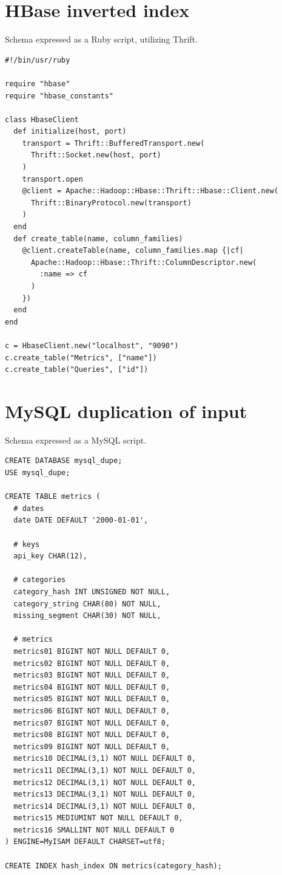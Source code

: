 \section{HBase inverted index}

Schema expressed as a Ruby script, utilizing Thrift.

\begin{verbatim}
#!/bin/usr/ruby

require "hbase"
require "hbase_constants"

class HbaseClient
  def initialize(host, port)
    transport = Thrift::BufferedTransport.new(
      Thrift::Socket.new(host, port)
    )
    transport.open
    @client = Apache::Hadoop::Hbase::Thrift::Hbase::Client.new(
      Thrift::BinaryProtocol.new(transport)
    )
  end
  def create_table(name, column_families)
    @client.createTable(name, column_families.map {|cf|
      Apache::Hadoop::Hbase::Thrift::ColumnDescriptor.new(
        :name => cf
      )
    })
  end
end

c = HbaseClient.new("localhost", "9090")
c.create_table("Metrics", ["name"])
c.create_table("Queries", ["id"])
\end{verbatim}

\section{MySQL duplication of input}

Schema expressed as a MySQL script.

\begin{verbatim}
CREATE DATABASE mysql_dupe;
USE mysql_dupe;

CREATE TABLE metrics ( 
  # dates
  date DATE DEFAULT '2000-01-01',

  # keys
  api_key CHAR(12),

  # categories  
  category_hash INT UNSIGNED NOT NULL,
  category_string CHAR(80) NOT NULL,
  missing_segment CHAR(30) NOT NULL,

  # metrics
  metrics01 BIGINT NOT NULL DEFAULT 0,
  metrics02 BIGINT NOT NULL DEFAULT 0,
  metrics03 BIGINT NOT NULL DEFAULT 0,
  metrics04 BIGINT NOT NULL DEFAULT 0,
  metrics05 BIGINT NOT NULL DEFAULT 0,
  metrics06 BIGINT NOT NULL DEFAULT 0,
  metrics07 BIGINT NOT NULL DEFAULT 0,
  metrics08 BIGINT NOT NULL DEFAULT 0,
  metrics09 BIGINT NOT NULL DEFAULT 0,
  metrics10 DECIMAL(3,1) NOT NULL DEFAULT 0,
  metrics11 DECIMAL(3,1) NOT NULL DEFAULT 0,
  metrics12 DECIMAL(3,1) NOT NULL DEFAULT 0,
  metrics13 DECIMAL(3,1) NOT NULL DEFAULT 0,
  metrics14 DECIMAL(3,1) NOT NULL DEFAULT 0,
  metrics15 MEDIUMINT NOT NULL DEFAULT 0,
  metrics16 SMALLINT NOT NULL DEFAULT 0
) ENGINE=MyISAM DEFAULT CHARSET=utf8;
 
CREATE INDEX hash_index ON metrics(category_hash);
\end{verbatim}


